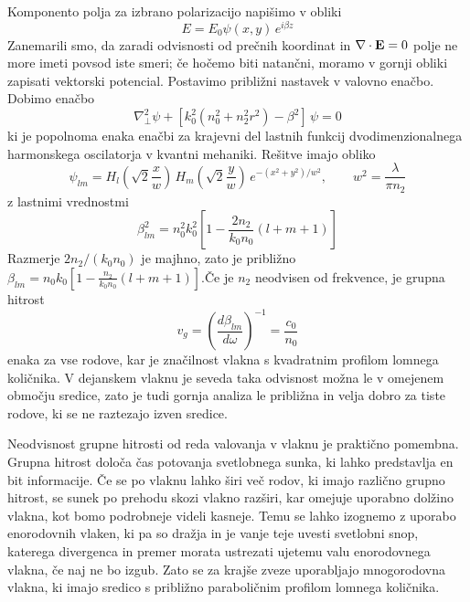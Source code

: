 Komponento polja za izbrano polarizacijo napišimo v obliki 
\begin{equation}
E=E_{0}\psi(x,y)\, e^{i\beta z}\label{9.16}
\end{equation}
 Zanemarili smo, da zaradi odvisnosti od prečnih koordinat in $\nabla\cdot{\bf E}=0$
polje ne more imeti povsod iste smeri; če hočemo biti natančni, moramo
v gornji obliki zapisati vektorski potencial. Postavimo približni
nastavek v valovno enačbo. Dobimo enačbo 
\begin{equation}
\nabla_{\perp}^{2}\psi+\left[k_{0}^{2}\left(n_{0}^{2}+n_{2}^{2}r^{2}\right)-\beta^{2}\right]\,\psi=0\label{9.17}
\end{equation}
 ki je popolnoma enaka enačbi za krajevni del lastnih funkcij dvodimenzionalnega
harmonskega oscilatorja v kvantni mehaniki. Rešitve imajo obliko 
\begin{equation}
\psi_{lm}=H_{l}\left(\sqrt{2}\frac{x}{w}\right)\, H_{m}\left(\sqrt{2}\frac{y}{w}\right)\, e^{-(x^{2}+y^{2})/w^{2}},\qquad w^{2}=\frac{\lambda}{\pi n_{2}}\label{9.18}
\end{equation}
 z lastnimi vrednostmi 
\begin{equation}
\beta_{lm}^{2}=n_{0}^{2}k_{0}^{2}\left[1-\frac{2n_{2}}{k_{0}n_{0}}\left(l+m+1\right)\right]\label{9.19}
\end{equation}
 Razmerje $2n_{2}/\left(k_{0}n_{0}\right)$ je majhno, zato je približno
$\beta_{lm}=n_{0}k_{0}\left[1-\frac{n_{2}}{k_{0}n_{0}}\left(l+m+1\right)\right].$Če
je $n_{2}$ neodvisen od frekvence, je grupna hitrost 
\begin{equation}
v_{g}=\left(\frac{d\beta_{lm}}{d\omega}\right)^{-1}=\frac{c_{0}}{n_{0}}\label{9.21}
\end{equation}
 enaka za vse rodove, kar je značilnost vlakna s kvadratnim profilom
lomnega količnika. V dejanskem vlaknu je seveda taka odvisnost možna
le v omejenem območju sredice, zato je tudi gornja analiza le približna
in velja dobro za tiste rodove, ki se ne raztezajo izven sredice.

Neodvisnost grupne hitrosti od reda valovanja v vlaknu je praktično
pomembna. Grupna hitrost določa čas potovanja svetlobnega sunka, ki
lahko predstavlja en bit informacije. Če se po vlaknu lahko širi več
rodov, ki imajo različno grupno hitrost, se sunek po prehodu skozi
vlakno razširi, kar omejuje uporabno dolžino vlakna, kot bomo podrobneje
videli kasneje. Temu se lahko izognemo z uporabo enorodovnih vlaken,
ki pa so dražja in je vanje te\textquotedbl{}je uvesti svetlobni snop,
katerega divergenca in premer morata ustrezati ujetemu valu enorodovnega
vlakna, če naj ne bo izgub. Zato se za krajše zveze uporabljajo mnogorodovna
vlakna, ki imajo sredico s približno paraboličnim profilom lomnega
količnika.


